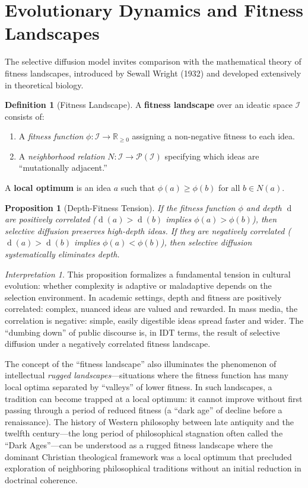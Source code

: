 \documentclass[11pt,openany]{book}
\theoremstyle{definition}
\newtheorem{definition}[axiom]{Definition}
\theoremstyle{plain}
\newtheorem{proposition}[axiom]{Proposition}
\theoremstyle{remark}
\newtheorem{interpretation}[axiom]{Interpretation}
\newcommand{\IS}{\mathcal{I}}               %
\newcommand{\depth}{\operatorname{d}}       %
\begin{document}
\section{Evolutionary Dynamics and Fitness Landscapes}

The selective diffusion model invites comparison with the mathematical theory of fitness landscapes, introduced by Sewall Wright (1932) and developed extensively in theoretical biology.

\begin{definition}[Fitness Landscape]
A \textbf{fitness landscape} over an ideatic space $\IS$ consists of:
\begin{enumerate}
\item A \emph{fitness function} $\phi : \IS \to \mathbb{R}_{\geq 0}$ assigning a non-negative fitness to each idea.
\item A \emph{neighborhood relation} $N : \IS \to \mathcal{P}(\IS)$ specifying which ideas are ``mutationally adjacent.''
\end{enumerate}
A \textbf{local optimum} is an idea $a$ such that $\phi(a) \geq \phi(b)$ for all $b \in N(a)$.
\end{definition}

\begin{proposition}[Depth-Fitness Tension]
If the fitness function $\phi$ and depth $\depth$ are positively correlated ($\depth(a) > \depth(b)$ implies $\phi(a) > \phi(b)$), then selective diffusion preserves high-depth ideas. If they are negatively correlated ($\depth(a) > \depth(b)$ implies $\phi(a) < \phi(b)$), then selective diffusion systematically eliminates depth.
\end{proposition}

\begin{interpretation}
This proposition formalizes a fundamental tension in cultural evolution: whether complexity is adaptive or maladaptive depends on the selection environment. In academic settings, depth and fitness are positively correlated: complex, nuanced ideas are valued and rewarded. In mass media, the correlation is negative: simple, easily digestible ideas spread faster and wider. The ``dumbing down'' of public discourse is, in IDT terms, the result of selective diffusion under a negatively correlated fitness landscape.

The concept of the ``fitness landscape'' also illuminates the phenomenon of intellectual \emph{rugged landscapes}---situations where the fitness function has many local optima separated by ``valleys'' of lower fitness. In such landscapes, a tradition can become trapped at a local optimum: it cannot improve without first passing through a period of reduced fitness (a ``dark age'' of decline before a renaissance). The history of Western philosophy between late antiquity and the twelfth century---the long period of philosophical stagnation often called the ``Dark Ages''---can be understood as a rugged fitness landscape where the dominant Christian theological framework was a local optimum that precluded exploration of neighboring philosophical traditions without an initial reduction in doctrinal coherence.
\end{interpretation}
\end{document}
